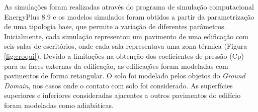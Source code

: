 \documentclass[brazil,hardcopy,openany,a5paper]{ufscthesis}
\begin{document}
%		

		As simulações foram realizadas através do programa de simulação computacional EnergyPlus 8.9 \cite{EnergyPlus2018} e os modelos simulados foram obtidos a partir da parametrização de uma tipologia base, que permite a variação de diferentes parâmetros.  %
		Inicialmente, cada simulação representou um pavimento de uma edificação com seis salas de escritórios, onde cada sala representava uma zona térmica (Figura \ref{fig:croqui}).
		Devido a limitações na obtenção dos coeficientes de pressão (Cp) para as faces externas da edificação, as edificações foram modeladas com pavimentos de forma retangular.
		O solo foi modelado pelos objetos do \textit{Ground Domain}, nos casos onde o contato com solo foi considerado. As superfícies superiores e inferiores consideradas ajacentes a outros pavimentos do edifício foram modeladas como adiabáticas.
		
\end{document}
